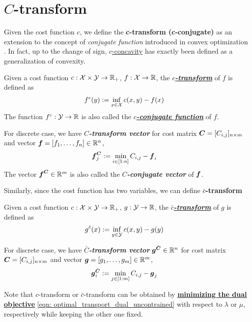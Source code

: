 \documentclass[11pt]{article}
\begin{document}
\section{$C$-transform}
Given the cost function $c$, we define the \textbf{c-transform (c-conjugate)} \citep{santambrogio2015optimal} as an extension to the concept of \emph{conjugate function} introduced in convex optimization \citep{rockafellar1970convex}. In fact, up to the change of sign, \underline{$c$-concavity} has exactly been defined as a generalization of convexity. 
\begin{definition}
Given a cost function $c: {\mathcal X} \times {\mathcal Y} \rightarrow {\mathbb R}_{+}$, $f: {\mathcal X} \rightarrow {\mathbb R}$, the \underline{\textbf{\emph{$c$-transform}}} of $f$ is defined as
\begin{align}
f^{c}(y) &:= \inf_{x\in {\mathcal X}}c(x, y) - f(x)  \label{eqn: c_transform}
\end{align} The function $f^{c}: {\mathcal Y} \rightarrow {\mathbb R}$ is also called the \underline{\textbf{\emph{$c$-conjugate function}}} of $f$. 

For discrete case, we have \textbf{\emph{$C$-transform vector}} for cost matrix $\boldsymbol{C} = [C_{i,j}]_{n \times m}$ and vector $\boldsymbol{f} = [f_1, \ldots, f_{n}] \in {\mathbb R}^{n}$, 
\begin{align}
 \boldsymbol{f}_{j}^{\boldsymbol{C}} &:= \min_{i \in [1:n]}C_{i,j} - \boldsymbol{f}_{i} \label{eqn: c_transform_vector}
\end{align} The vector $\boldsymbol{f}^{\boldsymbol{C}} \in {\mathbb R}^{m}$ is also called the \textbf{\emph{$C$-conjugate vector}} of $\boldsymbol{f}$.
\end{definition}

Similarly, since the cost function has two variables, we can define \textbf{$\bar{c}$-transform}
\begin{definition} 
Given a cost function $c: {\mathcal X} \times {\mathcal Y} \rightarrow {\mathbb R}_{+}$, $g: {\mathcal Y} \rightarrow {\mathbb R}$, the \underline{\textbf{\emph{$\bar{c}$-transform}}} of $g$ is defined as
\begin{align}
g^{\bar{c}}(x) &:= \inf_{y\in {\mathcal Y}}c(x, y) - g(y)  \label{eqn: c_bar_transform}
\end{align} 

For discrete case, we have \textbf{\emph{$\bar{C}$-transform vector}} $\boldsymbol{g}^{\bar{\boldsymbol{C}}} \in {\mathbb R}^{n}$ for cost matrix $\boldsymbol{C} = [C_{i,j}]_{n \times m}$ and vector $\boldsymbol{g} = [g_1, \ldots, g_{m}] \in {\mathbb R}^{m}$, 
\begin{align}
 \boldsymbol{g}_{i}^{\bar{\boldsymbol{C}}} &:= \min_{j \in [1:m]}C_{i,j} - \boldsymbol{g}_{j} \label{eqn: c_bar_transform_vector}
\end{align}
\end{definition}
Note that $c$-transform or $\bar{c}$-transform can be obtained by \underline{\textbf{minimizing the dual objective}} \eqref{eqn: optimal_transport_dual_uncontrained} with respect to $\lambda$ or $\mu$, respectively while keeping the other one fixed.
\end{document}
